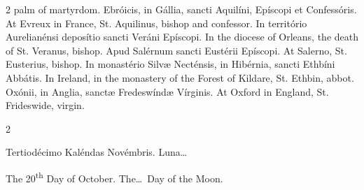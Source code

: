 \begin{paracol}{2}
 palm of martyrdom.
\switchcolumn*
{}
Ebróicis, in Gállia, 
 sancti Aquilíni, Epíscopi et Confessóris.
\switchcolumn
{}
At Evreux in France, St. Aquilinus, 
 bishop and confessor.
\switchcolumn*
{}
In território 
 Aurelianénsi deposítio sancti Veráni Epíscopi.
\switchcolumn
{}
In the diocese of Orleans, the death 
 of St. Veranus, bishop.
\switchcolumn*
{}
Apud Salérnum sancti 
 Eustérii Epíscopi.
\switchcolumn
{}
At Salerno, St. Eusterius, bishop.
\switchcolumn*
{}
In monastério Silvæ 
 Necténsis, in Hibérnia, sancti Ethbíni Abbátis.
\switchcolumn
{}
In Ireland, in the monastery of the 
 Forest of Kildare, St. Ethbin, abbot.
\switchcolumn*
{}
Oxónii, in Anglia, 
 sanctæ Fredeswíndæ Vírginis.
\switchcolumn
{}
At Oxford in England, St. Frideswide, 
 virgin.
\switchcolumn*
{}
\end{paracol}


\begin{paracol}{2}
\begin{center}{\color{gregoriocolor} Tertiodécimo Kaléndas Novémbris. 
 Luna\dots\ }\end{center}
\switchcolumn
{}
\begin{center}{\color{gregoriocolor} The   20\textsuperscript{th} Day of 
 October. The\dots\ Day of the Moon.}\end{center}
\end{paracol}


